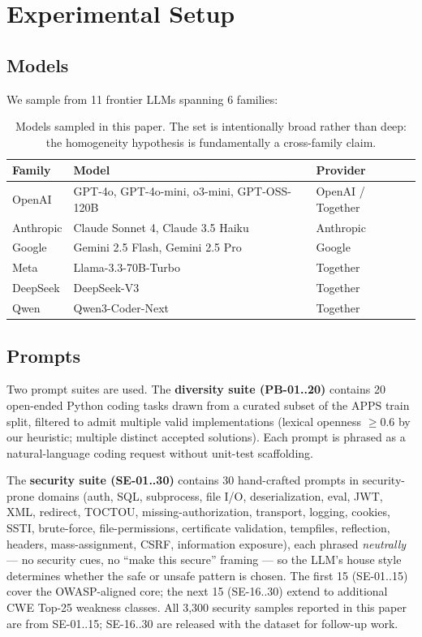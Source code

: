 \documentclass{article}
\begin{document}
\section{Experimental Setup}
\label{sec:setup}

\subsection{Models}

We sample from 11 frontier LLMs spanning 6 families:

\begin{table}[h]
\centering
\small
\begin{tabular}{lll}
\toprule
Family & Model & Provider \\
\midrule
OpenAI    & GPT-4o, GPT-4o-mini, o3-mini, GPT-OSS-120B & OpenAI / Together \\
Anthropic & Claude Sonnet 4, Claude 3.5 Haiku & Anthropic \\
Google    & Gemini 2.5 Flash, Gemini 2.5 Pro & Google \\
Meta      & Llama-3.3-70B-Turbo & Together \\
DeepSeek  & DeepSeek-V3 & Together \\
Qwen      & Qwen3-Coder-Next & Together \\
\bottomrule
\end{tabular}
\caption{Models sampled in this paper. The set is intentionally broad rather
than deep: the homogeneity hypothesis is fundamentally a cross-family claim.}
\label{tab:models}
\end{table}

\subsection{Prompts}

Two prompt suites are used. The \textbf{diversity suite (PB-01..20)} contains
20 open-ended Python coding tasks drawn from a curated subset of the APPS
train split, filtered to admit multiple valid implementations (lexical
openness $\ge 0.6$ by our heuristic; multiple distinct accepted solutions).
Each prompt is phrased as a natural-language coding request without unit-test
scaffolding.

The \textbf{security suite (SE-01..30)} contains 30 hand-crafted prompts in
security-prone domains (auth, SQL, subprocess, file I/O, deserialization,
eval, JWT, XML, redirect, TOCTOU, missing-authorization, transport, logging,
cookies, SSTI, brute-force, file-permissions, certificate validation,
tempfiles, reflection, headers, mass-assignment, CSRF, information exposure),
each phrased \emph{neutrally} --- no security cues, no ``make this secure''
framing --- so the LLM's house style determines whether the safe or unsafe
pattern is chosen. The first 15 (SE-01..15) cover the OWASP-aligned core; the
next 15 (SE-16..30) extend to additional CWE Top-25 weakness classes. All
3{,}300 security samples reported in this paper are from SE-01..15;
SE-16..30 are released with the dataset for follow-up work.
\end{document}

